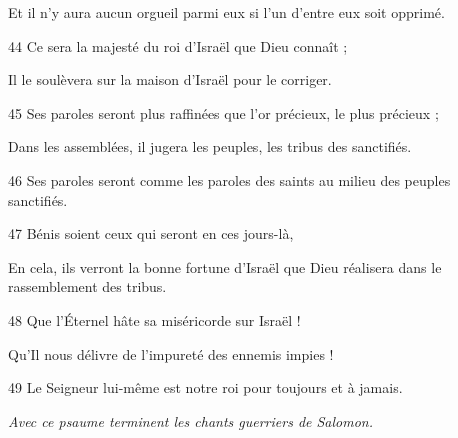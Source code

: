 \par     Et il n’y aura aucun orgueil parmi eux si l’un d’entre eux soit opprimé.
\par 44 Ce sera la majesté du roi d'Israël que Dieu connaît ;
\par     Il le soulèvera sur la maison d'Israël pour le corriger.
\par 45 Ses paroles seront plus raffinées que l'or précieux, le plus précieux ;
\par     Dans les assemblées, il jugera les peuples, les tribus des sanctifiés.
\par 46 Ses paroles seront comme les paroles des saints au milieu des peuples sanctifiés.
\par 47 Bénis soient ceux qui seront en ces jours-là,
\par     En cela, ils verront la bonne fortune d'Israël que Dieu réalisera dans le rassemblement des tribus.
\par 48 Que l'Éternel hâte sa miséricorde sur Israël !
\par     Qu'Il nous délivre de l'impureté des ennemis impies !
\par 49 Le Seigneur lui-même est notre roi pour toujours et à jamais.


\par \textit{Avec ce psaume terminent les chants guerriers de Salomon.}

